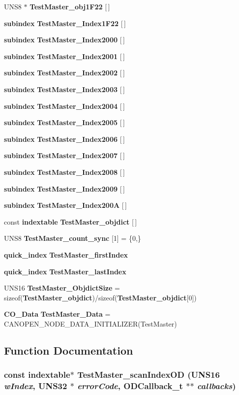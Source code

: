 \begin{CompactItemize}
\item 
UNS8 $\ast$ {\bf Test\-Master\_\-obj1F22} [$\,$]
\item 
{\bf subindex} {\bf Test\-Master\_\-Index1F22} [$\,$]
\item 
{\bf subindex} {\bf Test\-Master\_\-Index2000} [$\,$]
\item 
{\bf subindex} {\bf Test\-Master\_\-Index2001} [$\,$]
\item 
{\bf subindex} {\bf Test\-Master\_\-Index2002} [$\,$]
\item 
{\bf subindex} {\bf Test\-Master\_\-Index2003} [$\,$]
\item 
{\bf subindex} {\bf Test\-Master\_\-Index2004} [$\,$]
\item 
{\bf subindex} {\bf Test\-Master\_\-Index2005} [$\,$]
\item 
{\bf subindex} {\bf Test\-Master\_\-Index2006} [$\,$]
\item 
{\bf subindex} {\bf Test\-Master\_\-Index2007} [$\,$]
\item 
{\bf subindex} {\bf Test\-Master\_\-Index2008} [$\,$]
\item 
{\bf subindex} {\bf Test\-Master\_\-Index2009} [$\,$]
\item 
{\bf subindex} {\bf Test\-Master\_\-Index200A} [$\,$]
\item 
const {\bf indextable} {\bf Test\-Master\_\-objdict} [$\,$]
\item 
UNS8 {\bf Test\-Master\_\-count\_\-sync} [1] = \{0,\}
\item 
{\bf quick\_\-index} {\bf Test\-Master\_\-first\-Index}
\item 
{\bf quick\_\-index} {\bf Test\-Master\_\-last\-Index}
\item 
UNS16 {\bf Test\-Master\_\-Objdict\-Size} = sizeof({\bf Test\-Master\_\-objdict})/sizeof({\bf Test\-Master\_\-objdict}[0])
\item 
{\bf CO\_\-Data} {\bf Test\-Master\_\-Data} = CANOPEN\_\-NODE\_\-DATA\_\-INITIALIZER(Test\-Master)
\end{CompactItemize}


\subsection{Function Documentation}
\subsubsection{\setlength{\rightskip}{0pt plus 5cm}const {\bf indextable}$\ast$ Test\-Master\_\-scan\-Index\-OD (UNS16 {\em w\-Index}, UNS32 $\ast$ {\em error\-Code}, {\bf ODCallback\_\-t} $\ast$$\ast$ {\em callbacks})}\label{TestMasterSlave_2TestMaster_8c_6d2aa48880a24b9e8daaeb34fa36f820}


